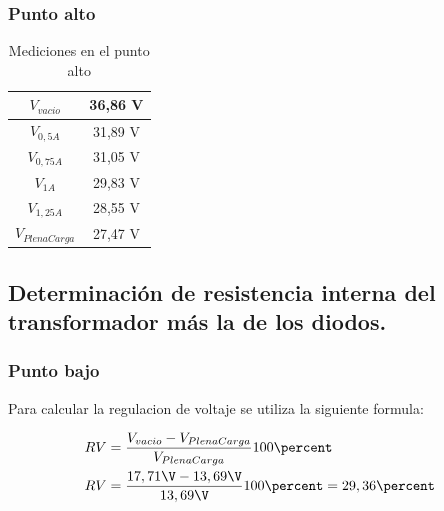 \subsubsection{Punto alto}

\begin{table}[H]
  \centering
  \begin{tabular}{|c|c|}
    \hline
    $V_{vacio}$ & 36,86 V \\ \hline
    $V_{0,5 A}$ & 31,89 V \\ \hline
    $V_{0,75 A}$ & 31,05 V \\ \hline    
    $V_{1 A}$ & 29,83 V \\ \hline
    $V_{1,25 A}$ & 28,55 V \\ \hline
    $V_{PlenaCarga}$ & 27,47 V \\ \hline
  \end{tabular}
  \caption{Mediciones en el punto alto}
\end{table}

\begin{figure}[H]
  \centering
\end{figure}

\subsection{Determinación de resistencia interna del transformador más la de los diodos.}

\subsubsection{Punto bajo}

Para calcular la regulacion de voltaje se utiliza la siguiente formula:

\begin{equation}
  \begin{aligned}
    RV &= \dfrac{V_{vacio} - V_{PlenaCarga}}{V_{PlenaCarga}} 100\percent \\
    RV &= \dfrac{17,71\V - 13,69\V}{13,69\V} 100\percent = 29,36\percent
  \end{aligned}
\end{equation}

